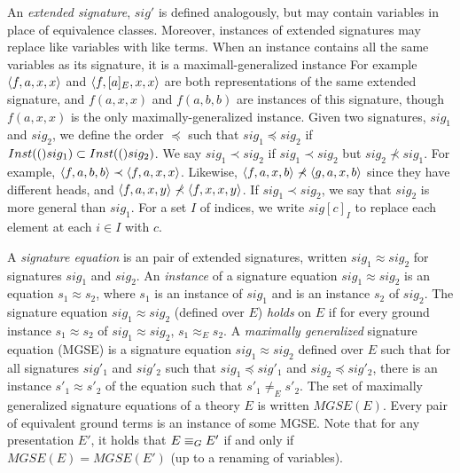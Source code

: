 An \emph{extended signature}, $sig'$ is defined analogously, but may contain variables in place of equivalence classes.
Moreover, instances of extended signatures may replace like variables with like terms.
When an instance contains all the same variables as its signature, it is a maximall-generalized instance
For example $\langle f,a,x,x \rangle$ and $\langle f,[a]_E,x,x \rangle$ are both representations of the same extended signature, and $f(a,x,x)$ and $f(a,b,b)$ are instances of this signature, though $f(a,x,x)$ is the only maximally-generalized instance. %
Given two signatures, $sig_1$ and $sig_2$, we define the order $\preceq$ such that  $sig_1 \preceq sig_2$ if $Inst(()sig_1) \subset Inst(()sig_2)$.
We say $sig_1 \prec sig_2$ if $sig_1 \prec sig_2$ but $sig_2 \not\prec sig_1$.
For example, $\langle f,a,b,b \rangle \prec \langle f,a,x,x \rangle$.
Likewise, $\langle f,a,x,b \rangle \not\prec \langle g,a,x,b \rangle$ since they have different heads, and $\langle f,a,x,y \rangle \not\prec \langle f,x,x,y \rangle$. %
If $sig_1 \prec sig_2$, we say that $sig_2$ is more general than $sig_1$.
For a set $I$ of indices, we write $sig[c]_I$ to replace each element at each $i \in I$ with $c$.

A \emph{signature equation} is an pair of extended signatures, written $sig_1 \approx sig_2$ for signatures $sig_1$ and $sig_2$.
An \emph{instance} of a signature equation $sig_1  \approx  sig_2$ is an equation $s_1 \approx s_2$, where $s_1$ is an instance of $sig_1$ and is an instance $s_2$ of $sig_2$.
The signature equation $sig_1 \approx sig_2$  (defined over $E$) \emph{holds} on $E$ if for every ground instance $s_1 \approx s_2$ of $sig_1 \approx sig_2$, $s_1 \approx_E s_2$.
A \emph{maximally generalized} signature equation (MGSE) is a signature equation $sig_1 \approx sig_2$ defined over $E$ such that for all signatures $sig'_1$ and $sig'_2$ such that $sig_1 \preceq sig'_1$ and $sig_2 \preceq sig'_2$, there is an instance $s'_1 \approx s'_2$ of the equation such that $s'_1 \ne_E s'_2$. 
The set of maximally generalized signature equations of a theory $E$ is written $MGSE(E)$.
Every pair of equivalent ground terms is an instance of some MGSE.
Note that for any presentation $E'$, it holds that $E \equiv_G E'$ if and only if $MGSE(E) = MGSE(E')$ (up to a renaming of variables). %



